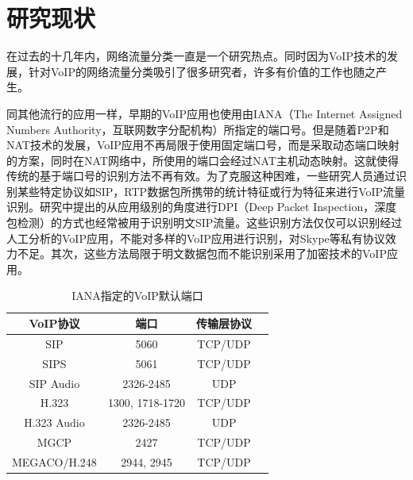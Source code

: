 
\section{研究现状}
\label{sec:researchsituation}
在过去的十几年内，网络流量分类一直是一个研究热点。同时因为VoIP技术的发展，针对VoIP的网络流量分类吸引了很多研究者，许多有价值的工作也随之产生。

同其他流行的应用一样，早期的VoIP应用也使用由IANA（The Internet Assigned Numbers Authority，互联网数字分配机构）所指定的端口号。但是随着P2P和NAT技术的发展，VoIP应用不再局限于使用固定端口号，而是采取动态端口映射的方案，同时在NAT网络中，所使用的端口会经过NAT主机动态映射。这就使得传统的基于端口号的识别方法不再有效。为了克服这种困难，一些研究人员\supercite{14, 16, 13}通过识别某些特定协议如SIP，RTP数据包所携带的统计特征或行为特征来进行VoIP流量识别。研究\supercite{18}中提出的从应用级别的角度进行DPI（Deep Packet Inspection，深度包检测）的方式也经常被用于识别明文SIP流量。这些识别方法仅仅可以识别经过人工分析的VoIP应用，不能对多样的VoIP应用进行识别，对Skype等私有协议效力不足。其次，这些方法局限于明文数据包而不能识别采用了加密技术的VoIP应用。

\begin{table} [thb]
\caption{IANA指定的VoIP默认端口}\label{tab:21}
\small
\centering
{
\begin{tabular}{cccc}
  \toprule
        VoIP协议 & 端口 & 传输层协议 \\
  \midrule
        SIP & 5060 & TCP/UDP \\
        SIPS & 5061 & TCP/UDP \\
        SIP Audio & 2326-2485 & UDP\\
        H.323 & 1300, 1718-1720 & TCP/UDP\\
        H.323 Audio & 2326-2485 & UDP\\
        MGCP & 2427 & TCP/UDP\\
        MEGACO/H.248 & 2944, 2945 & TCP/UDP\\
 \bottomrule
\end{tabular}
}
\end{table}

